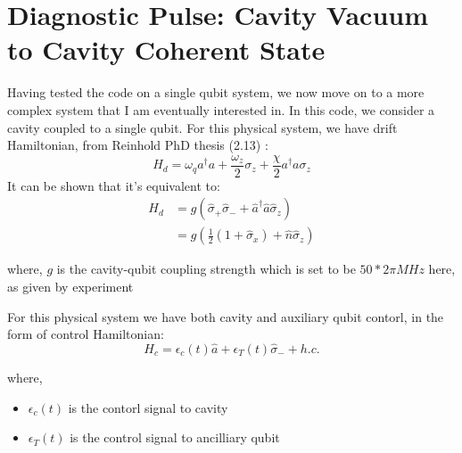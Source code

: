 \documentclass[12pt]{report}
\begin{document}



\section{Diagnostic Pulse: Cavity Vacuum to Cavity Coherent State}
Having tested the code on a single qubit system, we now move on to a more complex system that I am eventually interested in. 
In this code, we consider a cavity coupled to a single qubit.
For this physical system, we have drift Hamiltonian, 
from Reinhold PhD thesis (2.13) \cite{reinhold2019}: 
\begin{equation}
    H_d = \omega_q a^\dagger a + \frac{\omega_z}{2} \sigma_z + \frac{\chi}{2} a^\dagger a \sigma_z
\end{equation}
It can be shown that it's equivalent to: %
\begin{equation}
    \begin{aligned}
    H_d &= g\left( \hat{\sigma}_+ \hat{\sigma}_- + \hat{a}^{\dagger}\hat{a}\hat{\sigma}_z \right) \\
    &= g \left( \frac{1}{2}(1+\hat{\sigma}_x) + \hat{n}\hat{\sigma}_z\right)
\end{aligned}
\end{equation}

where, $g$ is the cavity-qubit coupling strength which is set to be $50*2 \pi MHz$ here, as given by experiment
\par
For this physical system we have both cavity and auxiliary qubit contorl, in the form of control Hamiltonian: 
\begin{equation}
    H_c = \epsilon_c(t) \hat{a} + \epsilon_T(t) \hat{\sigma}_- + h.c.
\end{equation}

where, 
\begin{itemize}
    \item $\epsilon_c(t)$ is the contorl signal to cavity
    \item $\epsilon_T(t)$ is the control signal to ancilliary qubit
\end{itemize} 
\end{document}
